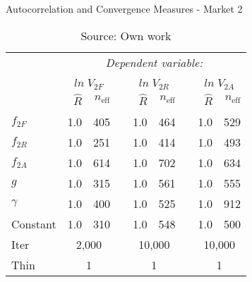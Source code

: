 \begin{table}[H]
\caption{Autocorrelation and Convergence Measures - Market 2}
\label{mkt2_T_autocorr_convergence}
\centering
\begin{tabular}{lrrrrrrrr}
\toprule 
 & \multicolumn{8}{c}{\textit{Dependent variable:}} \\ 
\cline{2-9} 
\\[-1.8ex] & \multicolumn{2}{c}{$ln \; V_{2F}$} & & \multicolumn{2}{c}{ $ln \; V_{2R}$} & &  \multicolumn{2}{c}{ $ln \; V_{2A}$}\\ 
\cline{2-3} \cline{5-6} \cline{8-9}
 & $\hat{R}$ & $n_{\text{eff}}$ & & $\hat{R}$ & $n_{\text{eff}}$  & & $\hat{R}$ & $n_{\text{eff}}$ \\ 
\hline \\[-1.8ex] 
  $f_{2F}$ & 1.0 & 405 & & 1.0 & 464 & & 1.0 & 529 \\ 
  $f_{2R}$ & 1.0 & 251 & & 1.0 & 414 & & 1.0 & 493 \\ 
  $f_{2A}$ & 1.0 & 614 & & 1.0 & 702 & & 1.0 & 634 \\ 
  $g$      & 1.0 & 315 & & 1.0 & 561 & & 1.0 & 555 \\ 
  $\gamma$ & 1.0 & 400 & & 1.0 & 525 & & 1.0 & 912 \\ 
  Constant & 1.0 & 310 & & 1.0 & 548 & & 1.0 & 500 \\
   \hline
   Iter    & \multicolumn{2}{c}{2,000} && \multicolumn{2}{c}{10,000} && \multicolumn{2}{c}{10,000} \\
   Thin    & \multicolumn{2}{c}{1} && \multicolumn{2}{c}{1} && \multicolumn{2}{c}{1} \\
   \bottomrule
\end{tabular}
\caption*{Source: Own work}
\end{table}
